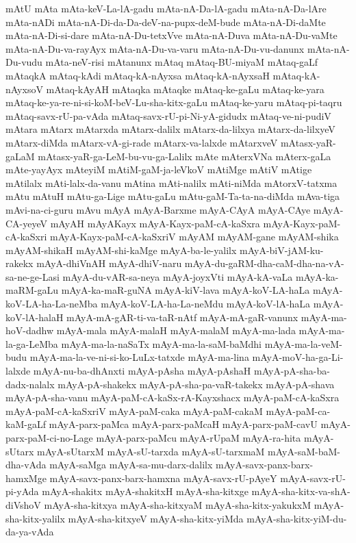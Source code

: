 {mAtU
mAta
mAta-keV-La-lA-gadu
mAta-nA-Da-lA-gadu
mAta-nA-Da-lAre
mAta-nADi
mAta-nA-Di-da-Da-deV-na-pupx-deM-bude
mAta-nA-Di-daMte
mAta-nA-Di-si-dare
mAta-nA-Du-tetxVve
mAta-nA-Duva
mAta-nA-Du-vaMte
mAta-nA-Du-va-rayAyx
mAta-nA-Du-va-varu
mAta-nA-Du-vu-danunx
mAta-nA-Du-vudu
mAta-neV-risi
mAtanunx
mAtaq
mAtaq-BU-miyaM
mAtaq-gaLf
mAtaqkA
mAtaq-kAdi
mAtaq-kA-nAyxsa
mAtaq-kA-nAyxsaH
mAtaq-kA-nAyxsoV
mAtaq-kAyAH
mAtaqka
mAtaqke
mAtaq-ke-gaLu
mAtaq-ke-yara
mAtaq-ke-ya-re-ni-si-koM-beV-Lu-sha-kitx-gaLu
mAtaq-ke-yaru
mAtaq-pi-taqru
mAtaq-savx-rU-pa-vAda
mAtaq-savx-rU-pi-Ni-yA-gidudx
mAtaq-ve-ni-pudiV
mAtara
mAtarx
mAtarxda
mAtarx-dalilx
mAtarx-da-lilxya
mAtarx-da-lilxyeV
mAtarx-diMda
mAtarx-vA-gi-rade
mAtarx-va-lalxde
mAtarxveV
mAtasx-yaR-gaLaM
mAtasx-yaR-ga-LeM-bu-vu-ga-Lalilx
mAte
mAterxVNa
mAterx-gaLa
mAte-yayAyx
mAteyiM
mAtiM-gaM-ja-leVkoV
mAtiMge
mAtiV
mAtige
mAtilalx
mAti-lalx-da-vanu
mAtina
mAti-nalilx
mAti-niMda
mAtorxV-tatxma
mAtu
mAtuH
mAtu-ga-Lige
mAtu-gaLu
mAtu-gaM-Ta-ta-na-diMda
mAva-tiga
mAvi-na-ci-guru
mAvu
mAyA
mAyA-Barxme
mAyA-CAyA
mAyA-CAye
mAyA-CA-yeyeV
mAyAH
mAyAKayx
mAyA-Kayx-paM-cA-kaSxra
mAyA-Kayx-paM-cA-kaSxri
mAyA-Kayx-paM-cA-kaSxriV
mAyAM
mAyAM-gane
mAyAM-shika
mAyAM-shikaH
mAyAM-shi-kaMge
mAyA-ba-le-yalilx
mAyA-biV-jAM-ku-rakekx
mAyA-dhiVnAH
mAyA-dhiV-naru
mAyA-du-gaRM-dha-caM-dha-na-vA-sa-ne-ge-Lasi
mAyA-du-vAR-sa-neya
mAyA-joyxVti
mAyA-kA-vaLa
mAyA-ka-maRM-gaLu
mAyA-ka-maR-guNA
mAyA-kiV-lava
mAyA-koV-LA-haLa
mAyA-koV-LA-ha-La-neMba
mAyA-koV-LA-ha-La-neMdu
mAyA-koV-lA-haLa
mAyA-koV-lA-halaH
mAyA-mA-gAR-ti-va-taR-nAtf
mAyA-mA-gaR-vanunx
mAyA-ma-hoV-dadhw
mAyA-mala
mAyA-malaH
mAyA-malaM
mAyA-ma-lada
mAyA-ma-la-ga-LeMba
mAyA-ma-la-naSaTx
mAyA-ma-la-saM-baMdhi
mAyA-ma-la-veM-budu
mAyA-ma-la-ve-ni-si-ko-LuLx-tatxde
mAyA-ma-lina
mAyA-moV-ha-ga-Li-lalxde
mAyA-nu-ba-dhAnxti
mAyA-pAsha
mAyA-pAshaH
mAyA-pA-sha-ba-dadx-nalalx
mAyA-pA-shakekx
mAyA-pA-sha-pa-vaR-takekx
mAyA-pA-shava
mAyA-pA-sha-vanu
mAyA-paM-cA-kaSx-rA-Kayxshacx
mAyA-paM-cA-kaSxra
mAyA-paM-cA-kaSxriV
mAyA-paM-caka
mAyA-paM-cakaM
mAyA-paM-ca-kaM-gaLf
mAyA-parx-paMca
mAyA-parx-paMcaH
mAyA-parx-paM-cavU
mAyA-parx-paM-ci-no-Lage
mAyA-parx-paMcu
mAyA-rUpaM
mAyA-ra-hita
mAyA-sUtarx
mAyA-sUtarxM
mAyA-sU-tarxda
mAyA-sU-tarxmaM
mAyA-saM-baM-dha-vAda
mAyA-saMga
mAyA-sa-mu-darx-dalilx
mAyA-savx-panx-barx-hamxMge
mAyA-savx-panx-barx-hamxna
mAyA-savx-rU-pAyeY
mAyA-savx-rU-pi-yAda
mAyA-shakitx
mAyA-shakitxH
mAyA-sha-kitxge
mAyA-sha-kitx-va-shA-diVshoV
mAyA-sha-kitxya
mAyA-sha-kitxyaM
mAyA-sha-kitx-yakukxM
mAyA-sha-kitx-yalilx
mAyA-sha-kitxyeV
mAyA-sha-kitx-yiMda
mAyA-sha-kitx-yiM-du-da-ya-vAda
}
